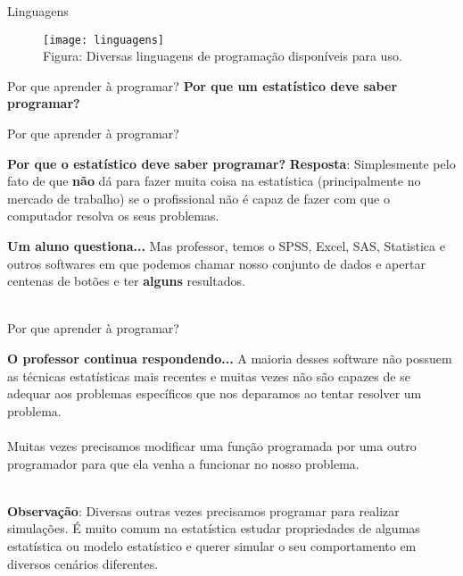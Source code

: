 \documentclass{beamer}
\begin{document}
\begin{frame}{Linguagens}
\begin{figure}[!htb]
\centering
\texttt{[image: linguagens]}\\
Figura: Diversas linguagens de programação disponíveis para uso.
\end{figure}
\end{frame}

\begin{frame}{Por que aprender à programar?}
\Large{\textbf{Por que um estatístico deve saber programar?}}
\end{frame}

\begin{frame}{Por que aprender à programar?}
\begin{block}{\textbf{Por que o estatístico deve saber programar?}}
\textbf{Resposta}: Simplesmente pelo fato de que \textbf{não} dá para fazer muita coisa na estatística (principalmente no mercado de trabalho) se o profissional não é capaz de fazer com que o computador resolva os seus problemas. 
\end{block}

\begin{block}{\textbf{Um aluno questiona...}}
Mas professor, temos o SPSS, Excel, SAS, Statistica e outros softwares em que podemos chamar nosso conjunto de dados e apertar centenas de botões e ter \textbf{alguns} resultados. \\~\\
\end{block}
\end{frame}

\begin{frame}{Por que aprender à programar?}
\begin{block}{\textbf{O professor continua respondendo...}}
A maioria desses software não possuem as técnicas estatísticas mais recentes e muitas vezes não são capazes de se adequar aos problemas específicos que nos deparamos ao tentar resolver um problema.\\~\\
Muitas vezes precisamos modificar uma função programada por uma outro programador para que ela venha a funcionar no nosso problema.\\~\\
\end{block}
\textbf{Observação}: Diversas outras vezes precisamos programar para realizar simulações. É muito comum na estatística estudar propriedades de algumas estatística ou modelo estatístico e querer simular o seu comportamento em diversos cenários diferentes.
\end{frame}
\end{document}
